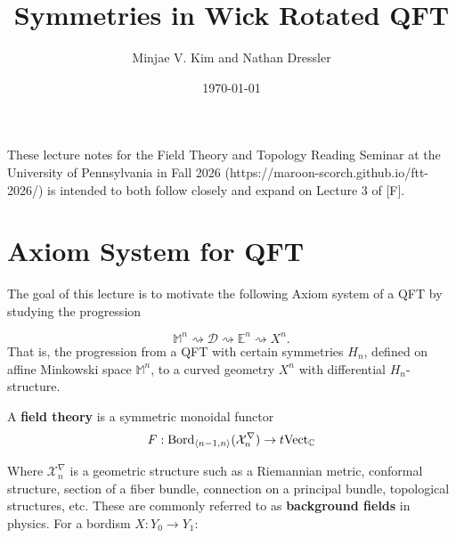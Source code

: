 \documentclass[a4paper,11pt]{article}
\begin{document}
\title{Symmetries in Wick Rotated QFT}
\author{Minjae V. Kim and Nathan Dressler}
\date{\today}
\maketitle


These lecture notes for the Field Theory and Topology Reading Seminar at the University of Pennsylvania
in Fall 2026 (https://maroon-scorch.github.io/ftt-2026/) is intended to both follow closely and expand on Lecture 3 of [F].


\section{Axiom System for QFT}
The goal of this lecture is to motivate the following Axiom system of a QFT by studying the progression 

\[
\mathbb{M}^n \rightsquigarrow \mathcal{D} \rightsquigarrow \mathbb{E}^n \rightsquigarrow X^n.
\]
That is, the progression from a QFT with certain symmetries $H_n$, defined on affine Minkowski space $\mathbb{M}^n$, to a curved geometry $X^n$ with differential $H_n$-structure.

\begin{axiom}
    A {\bf field theory} is a symmetric monoidal functor
    \begin{equation}
        F:  {\rm Bord}_{\langle n-1, n \rangle}({\mathcal X}^{\nabla}_n) \to t{\rm Vect}_{\mathbb{C}}
    \end{equation}
\end{axiom}


Where ${\mathcal X}^{\nabla}_n$ is a geometric structure such as a Riemannian metric, conformal structure, section of a fiber bundle, connection on a principal bundle, topological structures, etc. These are commonly referred to as {\bf background fields} in physics. For a bordism $X:Y_0\to Y_1$:
\end{document}
